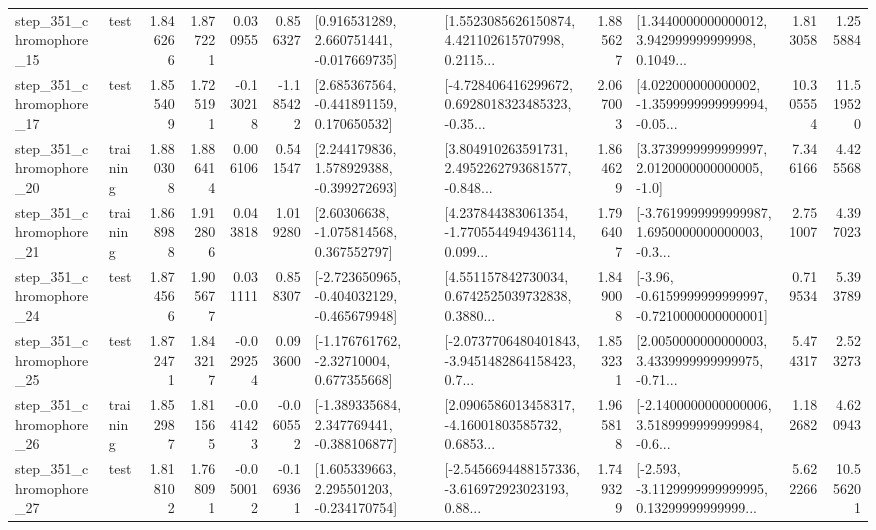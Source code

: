 \begin{tabular}{llrrrrllrlrr}
  step\_351\_chromophore\_15 &      test &      1.846266 &    1.877221 &      0.030955 &  0.856327 &    [0.916531289, 2.660751441, -0.017669735] &  [1.5523085626150874, 4.421102615707998, 0.2115... &       1.885627 &  [1.3440000000000012, 3.942999999999998, 0.1049... &            1.813058 &          1.255884 \\
  step\_351\_chromophore\_17 &      test &      1.855409 &    1.725191 &     -0.130218 & -1.185422 &    [2.685367564, -0.441891159, 0.170650532] &  [-4.728406416299672, 0.6928018323485323, -0.35... &       2.067003 &  [4.022000000000002, -1.3599999999999994, -0.05... &           10.305554 &         11.519520 \\
  step\_351\_chromophore\_20 &  training &      1.880308 &    1.886414 &      0.006106 &  0.541547 &    [2.244179836, 1.578929388, -0.399272693] &  [3.804910263591731, 2.4952262793681577, -0.848... &       1.864629 &     [3.3739999999999997, 2.0120000000000005, -1.0] &            7.346166 &          4.425568 \\
  step\_351\_chromophore\_21 &  training &      1.868988 &    1.912806 &      0.043818 &  1.019280 &     [2.60306638, -1.075814568, 0.367552797] &  [4.237844383061354, -1.7705544949436114, 0.099... &       1.796407 &  [-3.7619999999999987, 1.6950000000000003, -0.3... &            2.751007 &          4.397023 \\
  step\_351\_chromophore\_24 &      test &      1.874566 &    1.905677 &      0.031111 &  0.858307 &  [-2.723650965, -0.404032129, -0.465679948] &  [4.551157842730034, 0.6742525039732838, 0.3880... &       1.849008 &  [-3.96, -0.6159999999999997, -0.7210000000000001] &            0.719534 &          5.393789 \\
  step\_351\_chromophore\_25 &      test &      1.872471 &    1.843217 &     -0.029254 &  0.093600 &    [-1.176761762, -2.32710004, 0.677355668] &  [-2.0737706480401843, -3.9451482864158423, 0.7... &       1.853231 &  [2.0050000000000003, 3.4339999999999975, -0.71... &            5.474317 &          2.523273 \\
  step\_351\_chromophore\_26 &  training &      1.852987 &    1.811565 &     -0.041423 & -0.060552 &   [-1.389335684, 2.347769441, -0.388106877] &  [2.0906586013458317, -4.16001803585732, 0.6853... &       1.965818 &  [-2.1400000000000006, 3.5189999999999984, -0.6... &            1.182682 &          4.620943 \\
  step\_351\_chromophore\_27 &      test &      1.818102 &    1.768091 &     -0.050012 & -0.169361 &    [1.605339663, 2.295501203, -0.234170754] &  [-2.5456694488157336, -3.616972923023193, 0.88... &       1.749329 &  [-2.593, -3.1129999999999995, 0.13299999999999... &            5.622266 &         10.556201 \\

\end{tabular}
